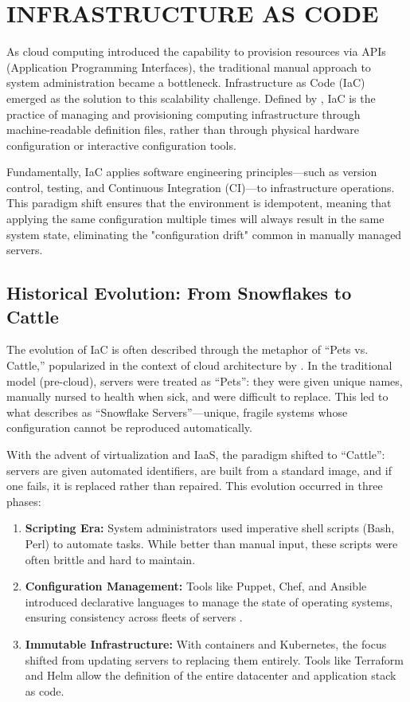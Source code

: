 \section{INFRASTRUCTURE AS CODE}
\label{sec:iac}

As cloud computing introduced the capability to provision resources via APIs (Application Programming Interfaces), the traditional manual approach to system administration became a bottleneck. Infrastructure as Code (IaC) emerged as the solution to this scalability challenge. Defined by , IaC is the practice of managing and provisioning computing infrastructure through machine-readable definition files, rather than through physical hardware configuration or interactive configuration tools.

Fundamentally, IaC applies software engineering principles—such as version control, testing, and Continuous Integration (CI)—to infrastructure operations. This paradigm shift ensures that the environment is idempotent, meaning that applying the same configuration multiple times will always result in the same system state, eliminating the "configuration drift" common in manually managed servers.

\subsection{Historical Evolution: From Snowflakes to Cattle}

The evolution of IaC is often described through the metaphor of ``Pets vs. Cattle,'' popularized in the context of cloud architecture by \cite{bias_2016}. In the traditional model (pre-cloud), servers were treated as ``Pets'': they were given unique names, manually nursed to health when sick, and were difficult to replace. This led to what  describes as ``Snowflake Servers''—unique, fragile systems whose configuration cannot be reproduced automatically.

With the advent of virtualization and IaaS, the paradigm shifted to ``Cattle'': servers are given automated identifiers, are built from a standard image, and if one fails, it is replaced rather than repaired. This evolution occurred in three phases:

\begin{enumerate}
    \item \textbf{Scripting Era:} System administrators used imperative shell scripts (Bash, Perl) to automate tasks. While better than manual input, these scripts were often brittle and hard to maintain.
    \item \textbf{Configuration Management:} Tools like Puppet, Chef, and Ansible introduced declarative languages to manage the state of operating systems, ensuring consistency across fleets of servers \cite{spinellis_2012}.
    \item \textbf{Immutable Infrastructure:} With containers and Kubernetes, the focus shifted from updating servers to replacing them entirely. Tools like Terraform and Helm allow the definition of the entire datacenter and application stack as code.
\end{enumerate}

